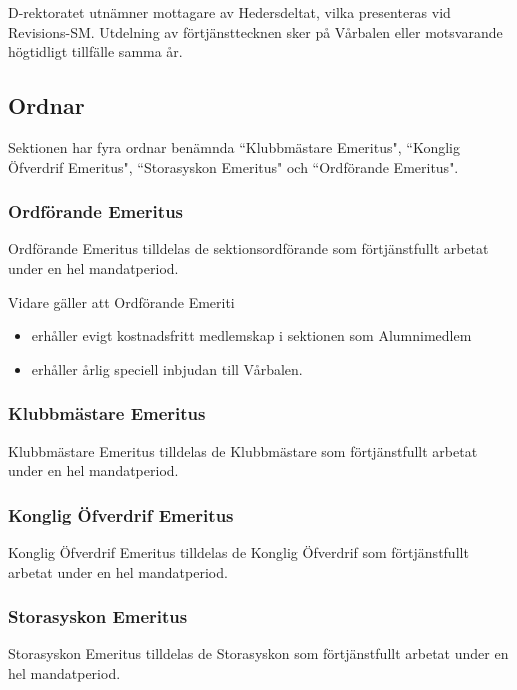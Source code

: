 \documentclass[a4paper,12pt]{article}
\begin{document}
D-rektoratet utnämner mottagare av Hedersdeltat, vilka presenteras vid Revisions-SM. Utdelning av förtjänsttecknen sker på Vårbalen eller motsvarande högtidligt tillfälle samma år.

\subsection{Ordnar}

Sektionen har fyra ordnar benämnda ``Klubbmästare Emeritus", ``Konglig Öfverdrif Emeritus", ``Storasyskon Emeritus" och ``Ordförande Emeritus".

\subsubsection{Ordförande Emeritus}

Ordförande Emeritus tilldelas de sektionsordförande som förtjänstfullt arbetat under en hel mandatperiod.

Vidare gäller att Ordförande Emeriti

\begin{itemize}
  \item erhåller evigt kostnadsfritt medlemskap i sektionen som Alumnimedlem
  \item erhåller årlig speciell inbjudan till Vårbalen.
\end{itemize}

\subsubsection{Klubbmästare Emeritus}

Klubbmästare Emeritus tilldelas de Klubbmästare som förtjänstfullt arbetat under en hel mandatperiod.

\subsubsection{Konglig Öfverdrif Emeritus}

Konglig Öfverdrif Emeritus tilldelas de Konglig Öfverdrif som förtjänstfullt arbetat under en hel mandatperiod.

\subsubsection{Storasyskon Emeritus}

Storasyskon Emeritus tilldelas de Storasyskon som förtjänstfullt arbetat under en hel mandatperiod.
\end{document}
